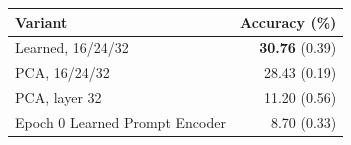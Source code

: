 \begingroup
\small
\setlength{\tabcolsep}{3pt}
\renewcommand{\arraystretch}{1.25}
\begin{tabular}{@{}>{\raggedright\arraybackslash}p{.56\linewidth}r@{}}
\toprule
Variant & Accuracy (\%) \\
\midrule
Learned, 16/24/32 & \textbf{30.76} {\scriptsize (0.39)} \\
PCA, 16/24/32 & 28.43 {\scriptsize (0.19)} \\
PCA, layer 32 & 11.20 {\scriptsize (0.56)} \\
Epoch 0 Learned Prompt Encoder & 8.70 {\scriptsize (0.33)} \\
\bottomrule
\end{tabular}
\endgroup
